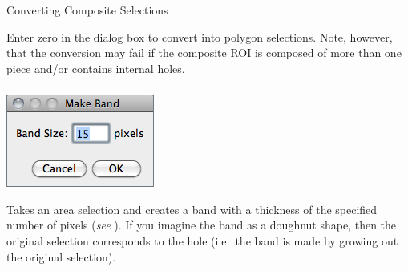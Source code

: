 \begin{infobox}
\caption{\label{infobox:Composites}Converting Composite Selections}


Enter zero in the 
dialog box to convert 
into polygon selections. Note, however, that the conversion may fail
if the composite ROI is composed of more than one piece and/or contains
internal holes.
\end{infobox}



\subsubsection[\protect\userinterface{Make Band\ldots{}}]{\protect{}\label{sub:Make-Band...}}

\begin{minipage}[c][1\totalheight][t]{0.28\columnwidth}%
\includegraphics[scale=0.55]{images/MakeBand}%
\end{minipage}%
\begin{minipage}[c][1\totalheight][t]{0.72\columnwidth}%
Takes an area selection and creates a band with a thickness of the
specified number of pixels (\emph{see} ).
If you imagine the band as a doughnut shape, then the original selection
corresponds to the hole (i.e.\ the band is made by growing out the
original selection).


%
\end{minipage}


\subsubsection{\protect{}\label{sub:Specify...}}

